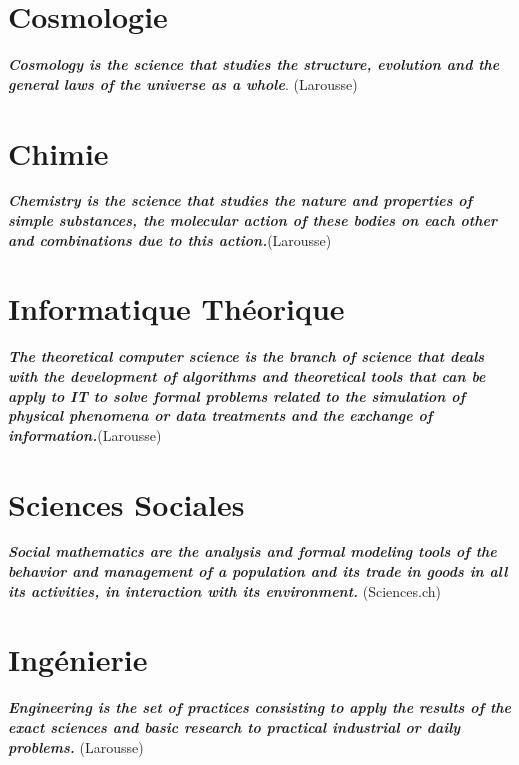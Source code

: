 \documentclass[12pt,a4paper,twoside,openright]{report}
\theoremstyle{definition}
\theoremstyle{itexmp}
\numberwithin{equation}{section}
\begin{document}
\chapter{Cosmologie}

	\textit{\textbf{Cosmology is the science that studies the structure, evolution and the general laws of the universe as a whole}}. (Larousse)
	\minitoc
	\pagebreak
	

	
\chapter{Chimie}

	\textit{\textbf{Chemistry is the science that studies the nature and properties of simple substances, the molecular action of these bodies on each other and combinations due to this action.}}(Larousse)
	\minitoc
	\pagebreak 
	
	
	
\chapter{Informatique Théorique}
	\label{theoretical computing}
	\textit{\textbf{The theoretical computer science is the branch of science that deals with the development of algorithms and theoretical tools that can be apply to IT to solve formal problems related to the simulation of physical phenomena or data treatments and the exchange of information.}}(Larousse)
	\minitoc
	\pagebreak 
	
	
	
\chapter{Sciences Sociales}

	\textit{\textbf{Social mathematics are the analysis and formal modeling tools of the behavior and management of a population and its trade in goods in all its activities, in interaction with its environment.}} (Sciences.ch)
	\minitoc
	\pagebreak
	
	
		
\chapter{Ingénierie}

	\textit{\textbf{Engineering is the set of practices consisting to apply the results of the exact sciences and basic research to practical industrial or daily problems.}} (Larousse)
	\minitoc
	\pagebreak
	
\end{document}
